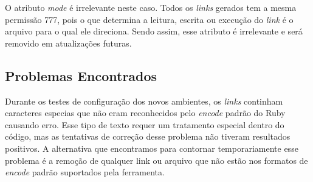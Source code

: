 \noindent\begin{minipage}{\textwidth}
  \lstset{style=shell}
  
\end{minipage}\hfill

O atributo \textit{mode} é irrelevante neste caso. Todos os \textit{links} gerados tem a mesma permissão
777, pois o que determina a leitura, escrita ou execução do \textit{link} é o arquivo para o qual ele
direciona. Sendo assim, esse atributo é irrelevante e será removido em atualizações futuras.

\subsection{Problemas Encontrados}

Durante os testes de configuração dos novos ambientes, os \textit{links} continham caracteres
especias que não eram reconhecidos pelo \textit{encode} padrão do Ruby causando erro.
Esse tipo de texto requer um tratamento especial dentro do código, mas as tentativas
de correção desse problema não tiveram resultados positivos. A alternativa que encontramos
para contornar temporariamente esse problema é a remoção de qualquer link ou arquivo que
não estão nos formatos de \textit{encode} padrão suportados pela ferramenta.

